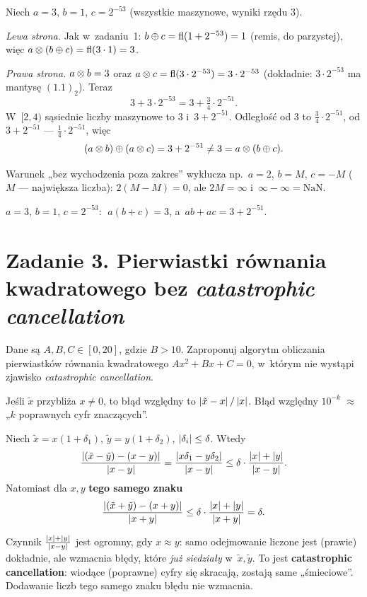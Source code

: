\documentclass[11pt]{article}
\begin{document}
\formalnie
Niech $a=3$, $b=1$, $c=2^{-53}$ (wszystkie maszynowe, wyniki rzędu $3$).

\emph{Lewa strona.} Jak w~zadaniu~1: $b\mathbin{\oplus} c=\operatorname{fl}(1+2^{-53})=1$ (remis,
do parzystej), więc $a\mathbin{\otimes}(b\mathbin{\oplus} c)=\operatorname{fl}(3\cdot1)=3$.

\emph{Prawa strona.} $a\mathbin{\otimes} b=3$ oraz $a\mathbin{\otimes} c=\operatorname{fl}(3\cdot2^{-53})=3\cdot2^{-53}$
(dokładnie: $3\cdot2^{-53}$ ma mantysę $(1.1)_2$). Teraz
\[
3+3\cdot2^{-53}=3+\tfrac34\cdot2^{-51}.
\]
W~$[2,4)$ sąsiednie liczby maszynowe to $3$ i~$3+2^{-51}$. Odległość od $3$
to $\tfrac34\cdot2^{-51}$, od $3+2^{-51}$ --- $\tfrac14\cdot2^{-51}$, więc
\[
(a\mathbin{\otimes} b)\mathbin{\oplus}(a\mathbin{\otimes} c)=3+2^{-51}\ne3=a\mathbin{\otimes}(b\mathbin{\oplus} c).
\]

\begin{uwaga}
Warunek „bez wychodzenia poza zakres” wyklucza np.\ $a=2$, $b=M$, $c=-M$
($M$ --- największa liczba): $2(M-M)=0$, ale $2M=\infty$ i~$\infty-\infty=\mathrm{NaN}$.
\end{uwaga}

\begin{odpowiedz}
$a=3$, $b=1$, $c=2^{-53}$: $\;a(b+c)=3$, a~$ab+ac=3+2^{-51}$.
\end{odpowiedz}

\section{Zadanie 3. Pierwiastki równania kwadratowego bez \emph{catastrophic cancellation}}
\begin{tresc}
Dane są $A,B,C\in[0,20]$, gdzie $B>10$. Zaproponuj algorytm obliczania
pierwiastków równania kwadratowego $Ax^2+Bx+C=0$, w~którym nie wystąpi
zjawisko \emph{catastrophic cancellation}.
\end{tresc}

\begin{teoria}
\begin{definicja}
Jeśli $\tilde x$ przybliża $x\ne0$, to błąd względny to
$\left\lvert \tilde x-x \right\rvert/\left\lvert x \right\rvert$. Błąd względny $10^{-k}$ $\approx$ „$k$ poprawnych
cyfr znaczących”.
\end{definicja}

\begin{lemat}\label{lem:cancel}
Niech $\tilde x=x(1+\delta_1)$, $\tilde y=y(1+\delta_2)$, $\left\lvert \delta_i \right\rvert\le\delta$.
Wtedy
\[
\frac{\left\lvert (\tilde x-\tilde y)-(x-y) \right\rvert}{\left\lvert x-y \right\rvert}
=\frac{\left\lvert x\delta_1-y\delta_2 \right\rvert}{\left\lvert x-y \right\rvert}
\le\delta\cdot\frac{\left\lvert x \right\rvert+\left\lvert y \right\rvert}{\left\lvert x-y \right\rvert}.
\]
Natomiast dla $x,y$ \textbf{tego samego znaku}
\[
\frac{\left\lvert (\tilde x+\tilde y)-(x+y) \right\rvert}{\left\lvert x+y \right\rvert}
\le\delta\cdot\frac{\left\lvert x \right\rvert+\left\lvert y \right\rvert}{\left\lvert x+y \right\rvert}=\delta.
\]
\end{lemat}

Czynnik $\frac{\left\lvert x \right\rvert+\left\lvert y \right\rvert}{\left\lvert x-y \right\rvert}$ jest ogromny, gdy $x\approx y$:
samo odejmowanie liczone jest (prawie) dokładnie, ale wzmacnia błędy, które
\emph{już siedziały} w~$\tilde x,\tilde y$. To jest \textbf{catastrophic
cancellation}: wiodące (poprawne) cyfry się skracają, zostają same
„śmieciowe”. Dodawanie liczb tego samego znaku błędu nie wzmacnia.
\end{teoria}
\end{document}
